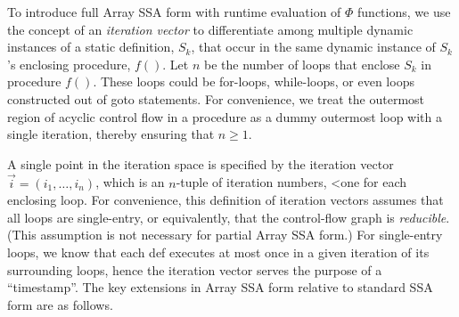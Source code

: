 To introduce full Array SSA form with runtime evaluation of $\Phi$
functions,
we use the concept of an  {\it iteration vector} to differentiate among multiple dynamic
instances of a static definition, $S_k$, that occur in the same
dynamic instance of $S_k$'s enclosing procedure, $f()$.
Let $n$ be the number of loops that enclose $S_k$ in procedure $f()$.
These loops could be for-loops, while-loops, or even loops constructed
out of goto statements.
For convenience, we treat the outermost
region of acyclic control flow in a procedure as a dummy outermost loop
with a single iteration, thereby ensuring that $n \geq 1$.

A single point in the
iteration space is specified by the iteration vector
$\vec{i} = (i_1, \ldots, i_n)$, which is
an 
$n$-tuple of iteration numbers,
<one for each enclosing loop. 
For convenience, this definition of iteration vectors assumes that  
all loops are single-entry, or equivalently, that the control-flow graph is {\it reducible}.
(This assumption is not necessary
for partial Array SSA form.)
For single-entry loops, we know that each def executes at most
once in a given iteration of its surrounding loops, hence the iteration vector
serves the purpose of a ``timestamp''.
The key extensions in Array SSA form relative to standard SSA form are as
follows.




